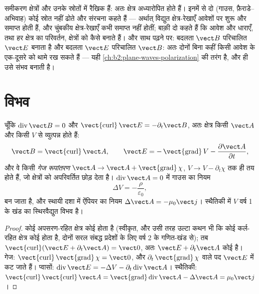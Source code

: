 \begin{remark}\label{rem:b2:maxwell-equations:linearity}
समीकरण क्षेत्रों और उनके स्रोतों में रैखिक हैं: अतः क्षेत्र
अध्यारोपित होते हैं। इनमें से दो (गाउस, फ़ैराडे--अभिवाह) कोई स्रोत नहीं ढोते और
संरचना कहते हैं --- अर्थात् विद्युत क्षेत्र-रेखाएँ आवेशों पर शुरू और समाप्त होती हैं,
और चुंबकीय क्षेत्र-रेखाएँ कभी समाप्त नहीं होतीं; बाक़ी दो कहते हैं कि आवेश और
धाराएँ, तथा हर क्षेत्र का परिवर्तन, क्षेत्रों को कैसे बनाते हैं। और साथ
पढ़ने पर: बदलता $\vect B$ परिचालित $\vect E$ बनाता है और बदलता
$\vect E$ परिचालित $\vect B$: अतः दोनों बिना कहीं किसी आवेश के एक-दूसरे को
थामे रख सकते हैं --- यही \cref{ch:b2:plane-waves-polarization} की तरंग है, और
 ही उसे संभव बनाती है।
\end{remark}

\section{विभव}

\begin{proposition}[अदिश और सदिश विभव]\label{prop:b2:maxwell-equations:potentials}
चूँकि $\operatorname{div}\vect B = 0$ और $\operatorname{\vect{curl}}\vect E = -\partial_t
\vect B$, अतः क्षेत्र किसी \emph{} $\vect A$ और किसी
\emph{} $V$ से व्युत्पन्न होते हैं:
\[
\vect B = \operatorname{\vect{curl}}\vect A , \qquad
\vect E = -\operatorname{\vect{grad}}V - \frac{\partial\vect A}{\partial t} ,
\]
और वे किसी \emph{गेज रूपांतरण} $\vect A \to \vect A +
\operatorname{\vect{grad}}\chi$, $V \to V - \partial_t\chi$ तक ही तय होते हैं, जो क्षेत्रों को
अपरिवर्तित छोड़ देता है। \emph{} $\operatorname{div}\vect A = 0$ में गाउस का
नियम \emph{}
\[
\Delta V = -\frac\rho{\varepsilon_0} ,
\]
बन जाता है, और स्थायी दशा में ऐंपियर का नियम $\Delta\vect A = -\mu_0\vect j$।
स्थैतिकी में $V$ वर्ष 1 के खंड का स्थिरवैद्युत विभव है।
\end{proposition}

\begin{proof}
कोई अपसरण-रहित क्षेत्र कोई  होता है (स्वीकृत, और उसी तरह उल्टा
कथन भी कि कोई कर्ल-रहित क्षेत्र कोई  होता है, दोनों सरल संबद्ध
प्रदेशों के लिए वर्ष 2 के गणित-खंड से); तब $\operatorname{\vect{curl}}
(\vect E + \partial_t\vect A) = \vect 0$, अतः $\vect E + \partial_t\vect A$ कोई  है।
गेज: $\operatorname{\vect{curl}}\operatorname{\vect{grad}}\chi = \vect 0$, और
$\partial_t\operatorname{\vect{grad}}\chi$ वाले पद $\vect E$ में कट जाते हैं। प्वासों: $\operatorname{div}
\vect E = -\Delta V - \partial_t\operatorname{div}\vect A$। स्थैतिकी: $\operatorname{\vect{curl}}
\operatorname{\vect{curl}}\vect A = \operatorname{\vect{grad}}\operatorname{div}\vect A - \Delta\vect A
= \mu_0\vect j$।
\end{proof}

